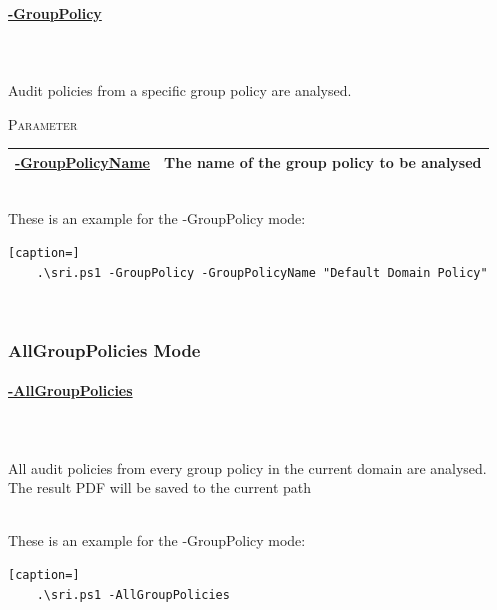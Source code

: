 \begin{tcolorbox}
    \paragraph{\underline{-GroupPolicy}} \ \\\\ Audit policies from a specific group policy are analysed.
    \vspace{0.3cm}
    \begin{center}
        \textsc{Parameter}
    \end{center}
    \vspace{-0.5cm}
    \begin{table}[H]
        \def\arraystretch{2}
        \centering
        \begin{tabular}{ p{4cm}  p{10cm} } \hline
            \textbf{\underline{-GroupPolicyName}} & The name of the group policy to be analysed \\ \hline
        \end{tabular}
    \end{table}
\end{tcolorbox}\ \\
These is an example for the -GroupPolicy mode: \ \\
\begin{lstlisting}[caption=]
    .\sri.ps1 -GroupPolicy -GroupPolicyName "Default Domain Policy"
\end{lstlisting}\ \\

\subsubsection{AllGroupPolicies Mode}

\begin{tcolorbox}
    \paragraph{\underline{-AllGroupPolicies}} \ \\\\
    All audit policies from every group policy in the current domain are analysed.\\
    The result PDF will be saved to the current path
\end{tcolorbox}\ \\
These is an example for the -GroupPolicy mode: \ \\
\begin{lstlisting}[caption=]
    .\sri.ps1 -AllGroupPolicies
\end{lstlisting}
